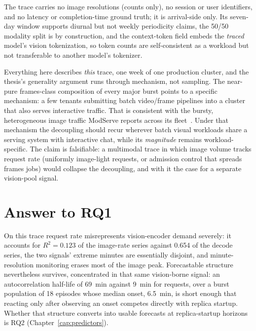 The trace carries no image resolutions (counts only), no session or user
identifiers, and no latency or completion-time ground truth; it is arrival-side
only. Its seven-day window supports diurnal but not weekly periodicity claims,
the 50/50 modality split is by construction, and the
context-token field embeds the \emph{traced} model's vision tokenization, so
token counts are self-consistent as a workload but not transferable to another
model's tokenizer.

Everything here describes \emph{this} trace, one week of one production cluster,
and the thesis's generality argument runs through mechanism, not sampling. The
near-pure frames-class composition of every major burst points to a specific
mechanism: a few tenants submitting batch video/frame pipelines into a cluster
that also serves interactive traffic. That is consistent with the bursty,
heterogeneous image traffic ModServe reports across its
fleet~\cite{Qiu2025ModServe}. Under that mechanism the decoupling should recur
wherever batch visual workloads share a serving system with interactive chat,
while its \emph{magnitude} remains workload-specific. The claim is falsifiable:
a multimodal trace in which image volume tracks request rate (uniformly
image-light requests, or admission control that spreads frames jobs) would
collapse the decoupling, and with it the case for a separate vision-pool signal.

\section{Answer to RQ1}
\label{sec:eda-answer}

On this trace request rate misrepresents vision-encoder demand severely: it
accounts for $R^2 = \num{0.123}$ of the image-rate series against \num{0.654} of
the decode series, the two signals' extreme minutes are essentially disjoint,
and minute-resolution monitoring erases most of the image peak. Forecastable
structure nevertheless survives, concentrated in that same vision-borne signal:
an autocorrelation half-life of \SI{69}{\minute} against \SI{9}{\minute} for
requests, over a burst population of 18 episodes whose median onset,
\SI{6.5}{\minute}, is short enough that reacting only after observing an onset
competes directly with replica startup. Whether that structure converts into
usable forecasts at replica-startup horizons is RQ2
(Chapter~\ref{cap:predictors}).
